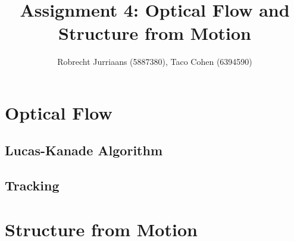 \documentclass[a4paper,10pt]{article}
\title{Assignment 4: Optical Flow and Structure from Motion}
\author{Robrecht Jurriaans (5887380), Taco Cohen (6394590)}
\begin{document}
\maketitle

\section{Optical Flow}

\subsection{Lucas-Kanade Algorithm}


\subsection{Tracking}


\section{Structure from Motion}
\end{document}

